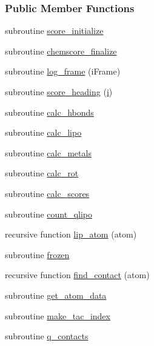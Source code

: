 \subsubsection*{Public Member Functions}
\begin{DoxyCompactItemize}
\item 
subroutine \hyperlink{classcalc__chemscore_af6e984aa1653e69de2ec2a501c90913d}{score\-\_\-initialize}
\item 
subroutine \hyperlink{classcalc__chemscore_ae933b171a206adf49ec5cde460082f5a}{chemscore\-\_\-finalize}
\item 
subroutine \hyperlink{classcalc__chemscore_ac981dadd7632147eefe3240bada21d79}{log\-\_\-frame} (i\-Frame)
\item 
subroutine \hyperlink{classcalc__chemscore_a281f50164f92a72afef6055495578adb}{score\-\_\-heading} (\hyperlink{classcalc__chemscore_a5579c59a11b61014e8a2d04bd984678e}{i})
\item 
subroutine \hyperlink{classcalc__chemscore_ac93b5a3a788abe9cc8dc2e98dc9c50bc}{calc\-\_\-hbonds}
\item 
subroutine \hyperlink{classcalc__chemscore_a6b8b6af53a8f99ef2db73dd097e88729}{calc\-\_\-lipo}
\item 
subroutine \hyperlink{classcalc__chemscore_a6755b67dc877c9ed91725640f577d272}{calc\-\_\-metals}
\item 
subroutine \hyperlink{classcalc__chemscore_af574f7169a6f5779bb0f7b26b3377e81}{calc\-\_\-rot}
\item 
subroutine \hyperlink{classcalc__chemscore_ac685deaa80ea9769e36c6b9ac8c8462d}{calc\-\_\-scores}
\item 
subroutine \hyperlink{classcalc__chemscore_afa2b8e0f000132f3f983c3781cc16115}{count\-\_\-qlipo}
\item 
recursive function \hyperlink{classcalc__chemscore_a8c71c15529a582f52f4d152db39e0704}{lip\-\_\-atom} (atom)
\item 
subroutine \hyperlink{classcalc__chemscore_a69331a1a41dd3b2dd7c69f272d87ebc5}{frozen}
\item 
recursive function \hyperlink{classcalc__chemscore_a95aa01634744dda8ac3af377750a6de1}{find\-\_\-contact} (atom)
\item 
subroutine \hyperlink{classcalc__chemscore_a4f53ad3d13e7c23d47c94a6a882e6bd8}{get\-\_\-atom\-\_\-data}
\item 
subroutine \hyperlink{classcalc__chemscore_a4bb62e49849feeae28e33973facd130e}{make\-\_\-tac\-\_\-index}
\item 
subroutine \hyperlink{classcalc__chemscore_a92a6bfaa5082d7b7d825e44c40226307}{q\-\_\-contacts}

\end{DoxyCompactItemize}
